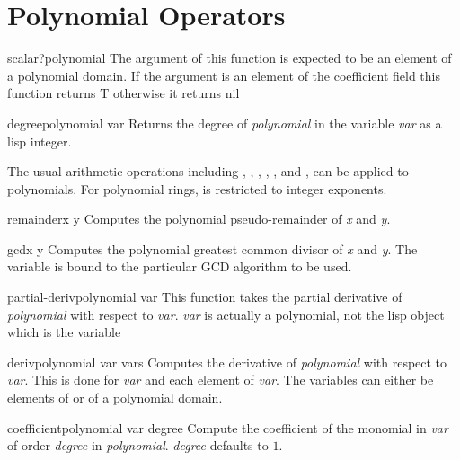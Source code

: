 \section{Polynomial Operators}
\label{Operate:Poly:Sec}

\begin{functiondef}{scalar?}{polynomial}
The argument of this function is expected to be an element of a
polynomial domain.  If the argument is an element of the coefficient
field this function returns {\sf T} otherwise it returns {\sf nil}
\end{functiondef}

\begin{functiondef}{degree}{polynomial var}
Returns the degree of {\em polynomial} in the variable {\em var} as a
lisp integer.
\end{functiondef}

The usual arithmetic operations including ,
, , ,
,  and , can be applied
to polynomials.  For polynomial rings,  is restricted to
integer exponents.

\begin{functiondef}{remainder}{x y}
Computes the polynomial pseudo-remainder of {\em x} and {\em y}.
\end{functiondef}

\begin{functiondef}{gcd}{x y}
Computes the polynomial greatest common divisor of {\em x} and {\em
y}.  The variable  is bound to the
particular GCD algorithm to be used.
\end{functiondef}

\begin{functiondef}{partial-deriv}{polynomial var}
This function takes the partial derivative of {\em polynomial} with
respect to {\em var\/}.  {\em var} is actually a polynomial, not the
lisp object which is the variable
\end{functiondef}

\begin{functiondef}{deriv}{polynomial var \rest vars}
Computes the derivative of {\em polynomial} with respect to {\em var}.
This is done for {\em var} and each element of {\em var\/}.  The
variables can either be elements of  or of a
polynomial domain.
\end{functiondef}

\begin{functiondef}{coefficient}{polynomial var \optional{} degree}
Compute the coefficient of the monomial in {\em var} of order {\em
degree} in {\em polynomial}.  {\em degree} defaults to $1$.
\end{functiondef}

